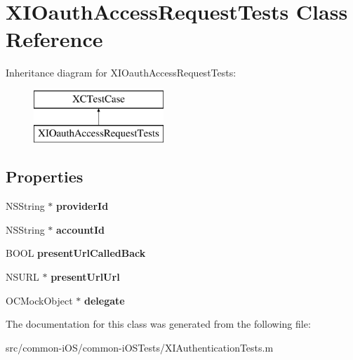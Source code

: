 \hypertarget{interface_x_i_oauth_access_request_tests}{}\section{X\+I\+Oauth\+Access\+Request\+Tests Class Reference}
\label{interface_x_i_oauth_access_request_tests}
Inheritance diagram for X\+I\+Oauth\+Access\+Request\+Tests\+:\begin{figure}[H]
\begin{center}
\leavevmode
\includegraphics[height=2.000000cm]{interface_x_i_oauth_access_request_tests}
\end{center}
\end{figure}
\subsection*{Properties}
\begin{DoxyCompactItemize}
\item 
\hypertarget{interface_x_i_oauth_access_request_tests_aec8076b3f096a4ffa8c259ff56431558}{}\label{interface_x_i_oauth_access_request_tests_aec8076b3f096a4ffa8c259ff56431558} 
N\+S\+String $\ast$ {\bfseries provider\+Id}
\item 
\hypertarget{interface_x_i_oauth_access_request_tests_ad7d0736ed2d72faa421c20c6431300c9}{}\label{interface_x_i_oauth_access_request_tests_ad7d0736ed2d72faa421c20c6431300c9} 
N\+S\+String $\ast$ {\bfseries account\+Id}
\item 
\hypertarget{interface_x_i_oauth_access_request_tests_a4b34e126c2bac7051c159d8a7b077f97}{}\label{interface_x_i_oauth_access_request_tests_a4b34e126c2bac7051c159d8a7b077f97} 
B\+O\+OL {\bfseries present\+Url\+Called\+Back}
\item 
\hypertarget{interface_x_i_oauth_access_request_tests_a1fff53a30d54474c17ec57a767154c4a}{}\label{interface_x_i_oauth_access_request_tests_a1fff53a30d54474c17ec57a767154c4a} 
N\+S\+U\+RL $\ast$ {\bfseries present\+Url\+Url}
\item 
\hypertarget{interface_x_i_oauth_access_request_tests_a1c2ff837af764d4f6be7f841a75ddc24}{}\label{interface_x_i_oauth_access_request_tests_a1c2ff837af764d4f6be7f841a75ddc24} 
O\+C\+Mock\+Object $\ast$ {\bfseries delegate}
\end{DoxyCompactItemize}


The documentation for this class was generated from the following file\+:\begin{DoxyCompactItemize}
\item 
src/common-\/i\+O\+S/common-\/i\+O\+S\+Tests/X\+I\+Authentication\+Tests.\+m\end{DoxyCompactItemize}

